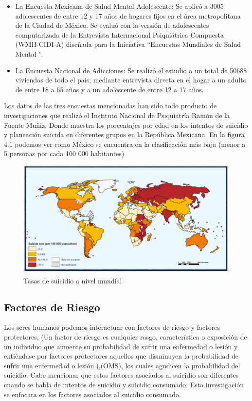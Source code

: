 {\begin{itemize}
\item La Encuesta Mexicana de Salud Mental Adolescente: Se aplicó a 3005 adolescentes  de entre 12 y 17 años de hogares fijos en el área metropolitana de la Ciudad de México. Se evaluó con la versión de adolescentes computarizada de la Entrevista Internacional Psiquiátrica Compuesta (WMH-CIDI-A) diseñada para la Iniciativa “Encuestas Mundiales de Salud Mental ".
\item La Encuesta Nacional de Adicciones: Se realizó el estudio a un total de 50688 viviendas de todo el país; mediante entrevista directa en el hogar a un adulto de entre 18 a 65 años y a un adolescente de entre 12 a 17 años.
\end{itemize}
Los datos de las tres encuestas mencionadas han sido todo producto de investigaciones que realizó el Instituto Nacional de Psiquiatría Ramón de la Fuente Muñiz. Donde muestra los porcentajes por edad en los intentos de suicidio y planeación suicida en diferentes grupos en la República Mexicana.
\linebreak
\linebreak
En la figura 4.1 podemos ver como México se encuentra en la clasificación más baja (menor a 5 personas por cada 100 000 habitantes)

\begin{figure}[hbtp]
\centering
\includegraphics[width=14cm]{imagenes/1-suicidio/imagen1.png}
\caption{Tasas de suicidio a nivel mundial}
\end{figure}

\subsection{Factores de Riesgo}{
Los seres humanos podemos interactuar con factores de riesgo y factores protectores, (Un factor de riesgo es cualquier rasgo, característica o exposición de un individuo que aumente su probabilidad de sufrir una enfermedad o lesión y entiéndase por factores protectores aquellos que disminuyen la probabilidad de sufrir una enfermedad o lesión.),(OMS), los cuales agudicen la probabilidad del suicidio. Cabe mencionar que estos factores asociados al suicidio son diferentes cuando se habla de intentos de suicidio y suicidio consumado. Esta investigación se enfocara en los factores asociados al suicidio consumado.

}}
